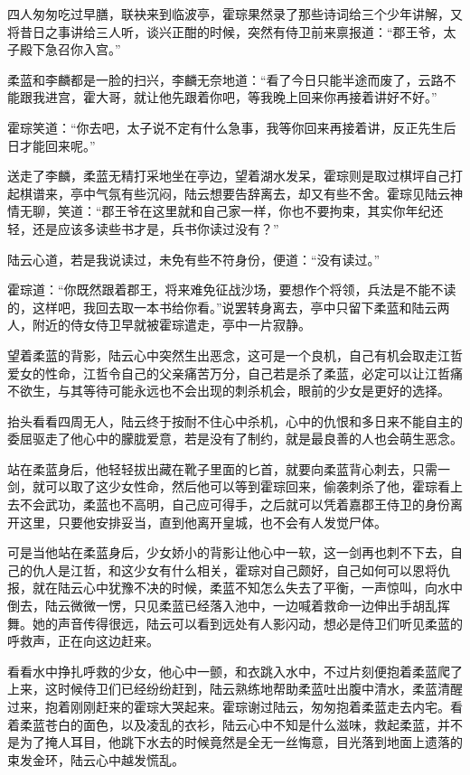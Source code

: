 四人匆匆吃过早膳，联袂来到临波亭，霍琮果然录了那些诗词给三个少年讲解，又将昔日之事讲给三人听，谈兴正酣的时候，突然有侍卫前来禀报道：“郡王爷，太子殿下急召你入宫。”

柔蓝和李麟都是一脸的扫兴，李麟无奈地道：“看了今日只能半途而废了，云路不能跟我进宫，霍大哥，就让他先跟着你吧，等我晚上回来你再接着讲好不好。”

霍琮笑道：“你去吧，太子说不定有什么急事，我等你回来再接着讲，反正先生后日才能回来呢。”

送走了李麟，柔蓝无精打采地坐在亭边，望着湖水发呆，霍琮则是取过棋坪自己打起棋谱来，亭中气氛有些沉闷，陆云想要告辞离去，却又有些不舍。霍琮见陆云神情无聊，笑道：“郡王爷在这里就和自己家一样，你也不要拘束，其实你年纪还轻，还是应该多读些书才是，兵书你读过没有？”

陆云心道，若是我说读过，未免有些不符身份，便道：“没有读过。”

霍琮道：“你既然跟着郡王，将来难免征战沙场，要想作个将领，兵法是不能不读的，这样吧，我回去取一本书给你看。”说罢转身离去，亭中只留下柔蓝和陆云两人，附近的侍女侍卫早就被霍琮遣走，亭中一片寂静。

望着柔蓝的背影，陆云心中突然生出恶念，这可是一个良机，自己有机会取走江哲爱女的性命，江哲令自己的父亲痛苦万分，自己若是杀了柔蓝，必定可以让江哲痛不欲生，与其等待可能永远也不会出现的刺杀机会，眼前的少女是更好的选择。

抬头看看四周无人，陆云终于按耐不住心中杀机，心中的仇恨和多日来不能自主的委屈驱走了他心中的朦胧爱意，若是没有了制约，就是最良善的人也会萌生恶念。

站在柔蓝身后，他轻轻拔出藏在靴子里面的匕首，就要向柔蓝背心刺去，只需一剑，就可以取了这少女性命，然后他可以等到霍琮回来，偷袭刺杀了他，霍琮看上去不会武功，柔蓝也不高明，自己应可得手，之后就可以凭着嘉郡王侍卫的身份离开这里，只要他安排妥当，直到他离开皇城，也不会有人发觉尸体。

可是当他站在柔蓝身后，少女娇小的背影让他心中一软，这一剑再也刺不下去，自己的仇人是江哲，和这少女有什么相关，霍琮对自己颇好，自己如何可以恩将仇报，就在陆云心中犹豫不决的时候，柔蓝不知怎么失去了平衡，一声惊叫，向水中倒去，陆云微微一愣，只见柔蓝已经落入池中，一边喊着救命一边伸出手胡乱挥舞。她的声音传得很远，陆云可以看到远处有人影闪动，想必是侍卫们听见柔蓝的呼救声，正在向这边赶来。

看看水中挣扎呼救的少女，他心中一颤，和衣跳入水中，不过片刻便抱着柔蓝爬了上来，这时候侍卫们已经纷纷赶到，陆云熟练地帮助柔蓝吐出腹中清水，柔蓝清醒过来，抱着刚刚赶来的霍琮大哭起来。霍琮谢过陆云，匆匆抱着柔蓝走去内宅。看着柔蓝苍白的面色，以及凌乱的衣衫，陆云心中不知是什么滋味，救起柔蓝，并不是为了掩人耳目，他跳下水去的时候竟然是全无一丝悔意，目光落到地面上遗落的束发金环，陆云心中越发慌乱。

